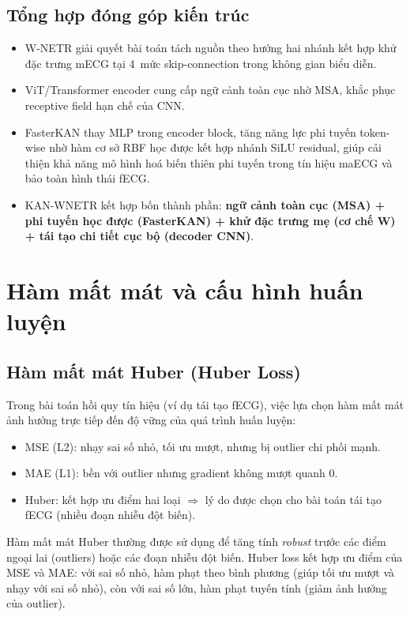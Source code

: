 \documentclass[../DoAn.tex]{subfiles}
\begin{document}
\subsection{Tổng hợp đóng góp kiến trúc}
\begin{itemize}
  \item W-NETR giải quyết bài toán tách nguồn theo hướng hai nhánh kết hợp khử đặc trưng mECG tại 4~mức skip-connection trong không gian biểu diễn.
  \item ViT/Transformer encoder cung cấp ngữ cảnh toàn cục nhờ MSA, khắc phục receptive field hạn chế của CNN.
  \item FasterKAN thay MLP trong encoder block, tăng năng lực phi tuyến token-wise nhờ hàm cơ sở RBF học được kết hợp nhánh SiLU residual, giúp cải thiện khả năng mô hình hoá biến thiên phi tuyến trong tín hiệu maECG và bảo toàn hình thái fECG.
  \item KAN-WNETR kết hợp bốn thành phần: \textbf{ngữ cảnh toàn cục (MSA) + phi tuyến học được (FasterKAN) + khử đặc trưng mẹ (cơ chế W) + tái tạo chi tiết cục bộ (decoder CNN)}.
\end{itemize}

\section{Hàm mất mát và cấu hình huấn luyện}
\label{sec:loss_training}

\subsection{Hàm mất mát Huber (Huber Loss)}

Trong bài toán hồi quy tín hiệu (ví dụ tái tạo fECG), việc lựa chọn hàm mất mát ảnh hưởng trực tiếp đến độ vững của quá trình huấn luyện:
\begin{itemize}
  \item MSE (L2): nhạy sai số nhỏ, tối ưu mượt, nhưng bị outlier chi phối mạnh.
  \item MAE (L1): bền với outlier nhưng gradient không mượt quanh 0.
  \item Huber: kết hợp ưu điểm hai loại $\Rightarrow$ lý do được chọn cho bài toán tái tạo fECG (nhiều đoạn nhiễu đột biến).
\end{itemize}

Hàm mất mát Huber thường được sử dụng để tăng tính \textit{robust} trước các điểm ngoại lai (outliers) hoặc các đoạn nhiễu đột biến. Huber loss kết hợp ưu điểm của MSE và MAE: với sai số nhỏ, hàm phạt theo bình phương (giúp tối ưu mượt và nhạy với sai số nhỏ), còn với sai số lớn, hàm phạt tuyến tính (giảm ảnh hưởng của outlier).
\end{document}
